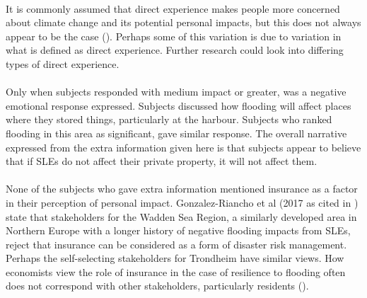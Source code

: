 \paragraph{}
It is commonly assumed that direct experience makes people more concerned about climate change and its potential personal impacts, but this does not always appear to be the case (\cite{lujala_role_2020}). Perhaps some of this variation is due to variation in what is defined as direct experience. Further research could look into differing types of direct experience. 
\paragraph{}
Only when subjects responded with medium impact or greater, was a negative emotional response expressed. Subjects discussed how flooding will affect places where they stored things, particularly at the harbour. Subjects who ranked flooding in this area as significant, gave similar response. The overall narrative expressed from the extra information given here is that subjects appear to believe that if SLEs do not affect their private property, it will not affect them. 
\paragraph{}
None of the subjects who gave extra information mentioned insurance as a factor in their perception of personal impact.  Gonzalez-Riancho et al (2017 as cited in \cite{gerkensmeier_governing_2018}) state that stakeholders for the Wadden Sea Region, a similarly developed area in Northern Europe with a longer history of negative flooding impacts from SLEs, reject that insurance can be considered as a form of disaster risk management. Perhaps the self-selecting stakeholders for Trondheim have similar views. How economists view the role of insurance in the case of resilience to flooding often does not correspond with other stakeholders, particularly residents (\cite{gerkensmeier_governing_2018}).
\paragraph{}

